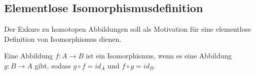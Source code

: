 
\subsection{Elementlose Isomorphismusdefinition}
Der Exkurs zu homotopen Abbildungen soll als Motivation für eine elementlose Definition von Isomorphismus dienen. 
\begin{df}
Eine Abbildung $f : A \rightarrow B$ ist ein Isomorphismus, wenn es eine Abbildung $g : B \rightarrow A$ gibt, sodass $g \circ f = id_{A}$ und $f \circ g = id_{B}$.
\end{df}

